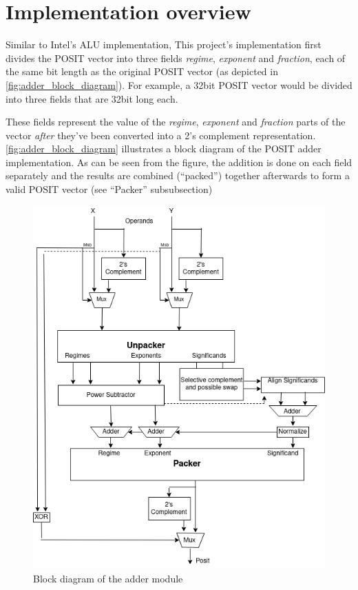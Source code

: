 \documentclass[10pt]{article}
\begin{document}
\section{Implementation overview}\label{sec:impl-overv}

Similar to Intel's ALU implementation, This project's implementation first
divides the POSIT vector into three fields \textit{regime}, \textit{exponent} and
\textit{fraction}, each of the same bit length as the original POSIT vector (as
depicted in \autoref{fig:adder_block_diagram}). For example, a 32bit POSIT
vector would be divided into three fields that are 32bit long each.

These fields represent the value of the \textit{regime}, \textit{exponent} and
\textit{fraction} parts of the vector \emph{after} they've been converted
into a 2's complement representation. \autoref{fig:adder_block_diagram}
illustrates a block diagram of the POSIT adder implementation. As can be seen
from the figure, the addition is done on each field separately and the results
are combined (``packed'') together afterwards to form a valid POSIT vector (see
``Packer'' subsubsection)

\begin{figure}[h]
  \centering
  \includegraphics[width=\textwidth, height=0.4\paperheight]{adder_block_diagram}
  \caption{Block diagram of the adder module}
  \label{fig:adder_block_diagram}
\end{figure}
\end{document}
